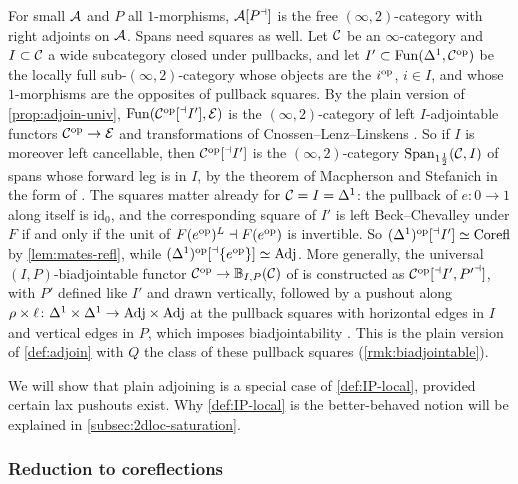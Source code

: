 \begin{exmp}
\label{ex:plain-spans}
%
For small $\mathcal{A}$ and $P$ all $1$-morphisms,
$\mathcal{A}[{P}^{\dashv}]$ is the free $(\infty,2)$-category with right adjoints on $\mathcal{A}$.
Spans need squares as well. Let $\mathcal{C}$ be an $\infty$-category and $I \subset \mathcal{C}$
a wide subcategory closed under pullbacks, and let
$I' \subset \operatorname{Fun}(\Delta^{1},\mathcal{C}^{\mathrm{op}})$
be the locally full sub-$(\infty,2)$-category whose objects are the $i^{\mathrm{op}}$,
$i \in I$, and whose $1$-morphisms are the opposites of pullback squares.
By the plain version of \cref{prop:adjoin-univ},
$\operatorname{Fun}(\mathcal{C}^{\mathrm{op}}[{}^{\dashv}{I'}],\mathcal{E})$
is the $(\infty,2)$-category of left $I$-adjointable functors $\mathcal{C}^{\mathrm{op}} \to \mathcal{E}$
and transformations of Cnossen--Lenz--Linskens
\cite[Def.~2.4]{cnossenlenzlinskens2025universal}.
So if $I$ is moreover left cancellable, then $\mathcal{C}^{\mathrm{op}}[{}^{\dashv}{I'}]$ is the
$(\infty,2)$-category
$\mathrm{Span}_{1\frac{1}{2}}(\mathcal{C},I)$
of spans whose forward leg is in $I$, by the theorem of Macpherson and Stefanich
\cite{macpherson2022bivariant,stefanich2020correspondences} in the form of
\cite[Cor.~4.21]{cnossenlenzlinskens2025universal}.
The squares matter already for $\mathcal{C} = I = \Delta^{1}$:
the pullback of $e\colon 0 \to 1$ along itself is $\mathrm{id}_{0}$,
and the corresponding square of $I'$ is left Beck--Chevalley under $F$ if and
only if the unit of
$F(e^{\mathrm{op}})^{L} \dashv F(e^{\mathrm{op}})$
is invertible. So
$(\Delta^{1})^{\mathrm{op}}[{}^{\dashv}{I'}] \simeq \mathrm{Corefl}$
by \cref{lem:mates-refl}, while
$(\Delta^{1})^{\mathrm{op}}[{}^{\dashv}{\{e^{\mathrm{op}}\}}] \simeq \mathrm{Adj}$.
More generally, the universal $(I,P)$-biadjointable functor
$\mathcal{C}^{\mathrm{op}} \to \mathbb{B}_{I,P}(\mathcal{C})$
of \cite[Thm.~2.10]{cnossenlenzlinskens2025universal} is constructed as
$\mathcal{C}^{\mathrm{op}}[{}^{\dashv}{I'},{P'}^{\dashv}]$,
with $P'$ defined like $I'$ and drawn vertically, followed by a pushout along
$\rho \times \ell\colon \Delta^{1} \times \Delta^{1} \to \mathrm{Adj} \times \mathrm{Adj}$
at the pullback squares with horizontal edges in $I$ and vertical edges in $P$,
which imposes biadjointability
\cite[Prop.~2.12]{cnossenlenzlinskens2025universal}.
This is the plain version of \cref{def:adjoin} with $Q$ the class of these
pullback squares (\cref{rmk:biadjointable}).
\end{exmp}

%
We will show that plain adjoining is a special case of \cref{def:IP-local},
provided certain lax pushouts exist. Why \cref{def:IP-local} is the
better-behaved notion will be explained in \cref{subsec:2dloc-saturation}.

\subsubsection*{Reduction to coreflections}

